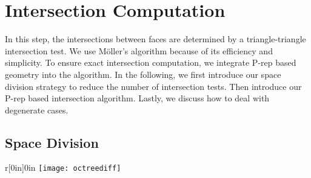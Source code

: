 \section{Intersection Computation}

\label{section:isect}

In this step, the intersections between faces are determined by a triangle-triangle intersection test. We use  M\"{o}ller's algorithm \cite{moller1997fast} because of its efficiency and simplicity. To ensure exact intersection computation, we integrate P-rep based geometry into the algorithm. In the following, we first introduce our space division strategy to reduce the number of intersection tests. Then introduce our P-rep based intersection algorithm. Lastly, we discuss how to deal with degenerate cases.

\subsection{Space Division}
\begin{wrapfigure}{r}[0in]{0in}
\texttt{[image: octreediff]}
\end{wrapfigure}



